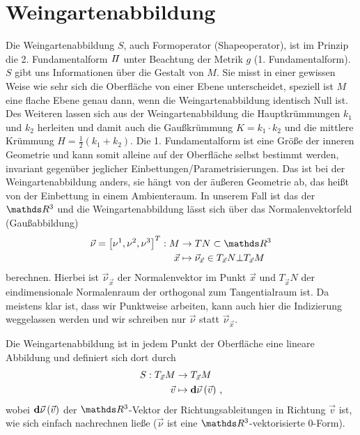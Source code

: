 \section{Weingartenabbildung}
\label{secWeingartenabbildung}
  Die Weingartenabbildung \( S \), auch Formoperator (Shapeoperator), ist im Prinzip die 2. Fundamentalform \( I \! I \) unter Beachtung der Metrik \(
 g \) (1. Fundamentalform).
  \( S \) gibt uns Informationen über die Gestalt von \( M \). 
  Sie misst in einer gewissen Weise wie sehr sich die Oberfläche von einer Ebene unterscheidet, speziell ist \( M \) eine flache Ebene
  genau dann, wenn die Weingartenabbildung identisch Null ist.
  Des Weiteren lassen sich aus der Weingartenabbildung die Hauptkrümmungen \( k_{1} \) und \( k_{2} \) herleiten und damit auch die
  Gaußkrümmung \( K = k_{1}\cdot k_{2} \) und die mittlere Krümmung \( H = \frac{1}{2}\left( k_{1} + k_{2} \right) \).
  Die 1. Fundamentalform ist eine Größe der inneren Geometrie und kann somit alleine auf der Oberfläche
  selbst bestimmt werden,
  invariant gegenüber jeglicher Einbettungen/Parametrisierungen.
  Das ist bei der Weingartenabbildung anders, sie hängt von der äußeren Geometrie ab, 
  das heißt von der Einbettung in einem Ambienteraum.
  In unserem Fall ist das der \( \R^{3} \) und die Weingartenabbildung lässt sich über das Normalenvektorfeld 
  (Gaußabbildung)
  \begin{align}
    \vec{\nu} = \left[ \nu^{1}, \nu^{2}, \nu^{3} \right]^{T}: M &\rightarrow TN \subset \R^{3} \\
                         \vec{x} &\mapsto \vec{\nu}_{\vec{x}} \in T_{\vec{x}}N \bot T_{\vec{x}}M
  \end{align}
  berechnen. 
  Hierbei ist \( \vec{\nu}_{\vec{x}} \) der Normalenvektor im Punkt \( \vec{x} \) und \( T_{\vec{x}}N \) der eindimensionale Normalenraum
  der orthogonal zum Tangentialraum ist. 
  Da meistens klar ist, dass wir Punktweise arbeiten, kann auch hier die Indizierung weggelassen werden und wir schreiben nur 
  \( \vec{\nu} \) statt \( \vec{\nu}_{\vec{x}} \).
  \begin{definition}
    Die Weingartenabbildung ist in jedem Punkt der Oberfläche eine lineare Abbildung und definiert sich dort durch
    \begin{align}
      S: T_{\vec{x}}M &\rightarrow T_{\vec{x}}M \\
                    \vec{v} &\mapsto \mathbf{d}\vec{\nu} \left( \vec{v} \right) \,\text{,}
    \end{align}
    wobei \( \mathbf{d}\vec{\nu} \left( \vec{v} \right) \) der \( \R^{3} \)-Vektor der Richtungsableitungen in Richtung \( \vec{v}
    \) ist, wie sich einfach nachrechnen ließe (\( \vec{\nu} \) ist eine \( \R^{3} \)-vektorisierte 0-Form).
  \end{definition}
